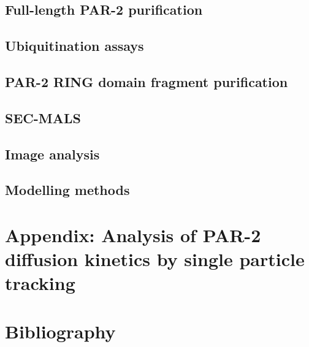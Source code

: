 \documentclass[12pt]{"article"}
\begin{document}
\subsection{Full-length PAR-2 purification}
\subsection{Ubiquitination assays}
\subsection{PAR-2 RING domain fragment purification}
\subsection{SEC-MALS}
\subsection{Image analysis}
\subsection{Modelling methods}

\clearpage
\section{Appendix: Analysis of PAR-2 diffusion kinetics by single particle tracking}


\clearpage
\section{Bibliography}
\end{document}

